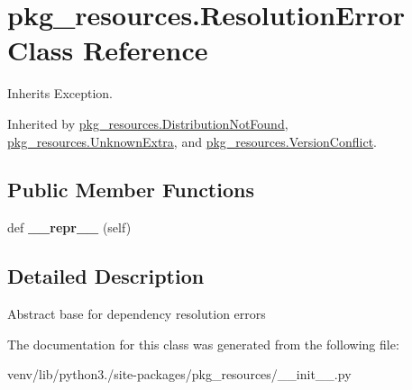 \hypertarget{classpkg__resources_1_1_resolution_error}{}\section{pkg\+\_\+resources.\+Resolution\+Error Class Reference}
\label{classpkg__resources_1_1_resolution_error}


Inherits Exception.



Inherited by \hyperlink{classpkg__resources_1_1_distribution_not_found}{pkg\+\_\+resources.\+Distribution\+Not\+Found}, \hyperlink{classpkg__resources_1_1_unknown_extra}{pkg\+\_\+resources.\+Unknown\+Extra}, and \hyperlink{classpkg__resources_1_1_version_conflict}{pkg\+\_\+resources.\+Version\+Conflict}.

\subsection*{Public Member Functions}
\begin{DoxyCompactItemize}
\item 
\mbox{\label{classpkg__resources_1_1_resolution_error_a6f7aee7ab8931a20c36cf96c564fcf55}} 
def {\bfseries \+\_\+\+\_\+repr\+\_\+\+\_\+} (self)
\end{DoxyCompactItemize}


\subsection{Detailed Description}
\begin{DoxyVerb}Abstract base for dependency resolution errors\end{DoxyVerb}
 

The documentation for this class was generated from the following file\+:\begin{DoxyCompactItemize}
\item 
venv/lib/python3./site-\/packages/pkg\+\_\+resources/\+\_\+\+\_\+init\+\_\+\+\_\+.\+py\end{DoxyCompactItemize}
